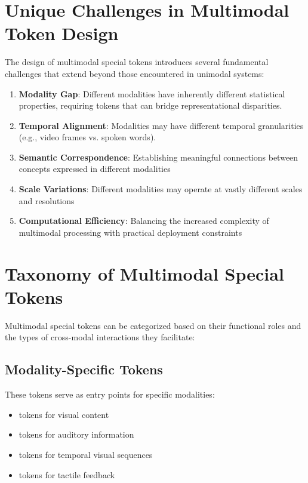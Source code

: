 \section{Unique Challenges in Multimodal Token Design}

The design of multimodal special tokens introduces several fundamental challenges that extend beyond those encountered in unimodal systems:

\begin{enumerate}
\item \textbf{Modality Gap}: Different modalities have inherently different statistical properties, requiring tokens that can bridge representational disparities.
\item \textbf{Temporal Alignment}: Modalities may have different temporal granularities (e.g., video frames vs. spoken words).
\item \textbf{Semantic Correspondence}: Establishing meaningful connections between concepts expressed in different modalities
\item \textbf{Scale Variations}: Different modalities may operate at vastly different scales and resolutions
\item \textbf{Computational Efficiency}: Balancing the increased complexity of multimodal processing with practical deployment constraints
\end{enumerate}
\begin{comment}
Examples for the above challenges:
- Modality Gap: "How can a model learn that a jagged, high-frequency sound wave (the token for a dog barking) corresponds to a specific configuration of pixels (the token for a dog's image)?"
- Temporal Alignment: "A single word might span multiple video frames, requiring tokens that can handle this asynchronous relationship."
\end{comment}

\section{Taxonomy of Multimodal Special Tokens}

Multimodal special tokens can be categorized based on their functional roles and the types of cross-modal interactions they facilitate:

\subsection{Modality-Specific Tokens}
These tokens serve as entry points for specific modalities:
\begin{itemize}
\item \img{} tokens for visual content
\item {} tokens for auditory information
\item {} tokens for temporal visual sequences
\item {} tokens for tactile feedback
\end{itemize}


